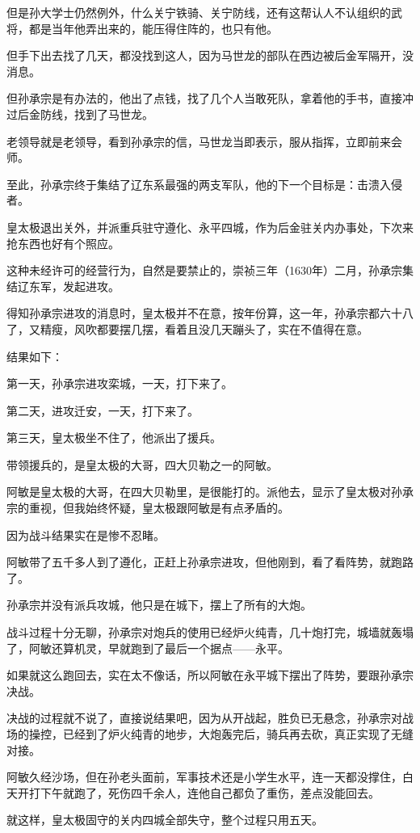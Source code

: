 \begin{multicols}{\theparacolNo}
但是孙大学士仍然例外，什么关宁铁骑、关宁防线，还有这帮认人不认组织的武将，都是当年他弄出来的，能压得住阵的，也只有他。

但手下出去找了几天，都没找到这人，因为马世龙的部队在西边被后金军隔开，没消息。

但孙承宗是有办法的，他出了点钱，找了几个人当敢死队，拿着他的手书，直接冲过后金防线，找到了马世龙。

老领导就是老领导，看到孙承宗的信，马世龙当即表示，服从指挥，立即前来会师。

至此，孙承宗终于集结了辽东系最强的两支军队，他的下一个目标是：击溃入侵者。

皇太极退出关外，并派重兵驻守遵化、永平四城，作为后金驻关内办事处，下次来抢东西也好有个照应。

这种未经许可的经营行为，自然是要禁止的，崇祯三年（1630年）二月，孙承宗集结辽东军，发起进攻。

得知孙承宗进攻的消息时，皇太极并不在意，按年份算，这一年，孙承宗都六十八了，又精瘦，风吹都要摆几摆，看着且没几天蹦头了，实在不值得在意。

结果如下：

第一天，孙承宗进攻栾城，一天，打下来了。

第二天，进攻迁安，一天，打下来了。

第三天，皇太极坐不住了，他派出了援兵。

带领援兵的，是皇太极的大哥，四大贝勒之一的阿敏。

阿敏是皇太极的大哥，在四大贝勒里，是很能打的。派他去，显示了皇太极对孙承宗的重视，但我始终怀疑，皇太极跟阿敏是有点矛盾的。

因为战斗结果实在是惨不忍睹。

阿敏带了五千多人到了遵化，正赶上孙承宗进攻，但他刚到，看了看阵势，就跑路了。

孙承宗并没有派兵攻城，他只是在城下，摆上了所有的大炮。

战斗过程十分无聊，孙承宗对炮兵的使用已经炉火纯青，几十炮打完，城墙就轰塌了，阿敏还算机灵，早就跑到了最后一个据点——永平。

如果就这么跑回去，实在太不像话，所以阿敏在永平城下摆出了阵势，要跟孙承宗决战。

决战的过程就不说了，直接说结果吧，因为从开战起，胜负已无悬念，孙承宗对战场的操控，已经到了炉火纯青的地步，大炮轰完后，骑兵再去砍，真正实现了无缝对接。

阿敏久经沙场，但在孙老头面前，军事技术还是小学生水平，连一天都没撑住，白天开打下午就跑了，死伤四千余人，连他自己都负了重伤，差点没能回去。

就这样，皇太极固守的关内四城全部失守，整个过程只用五天。


\end{multicols}
